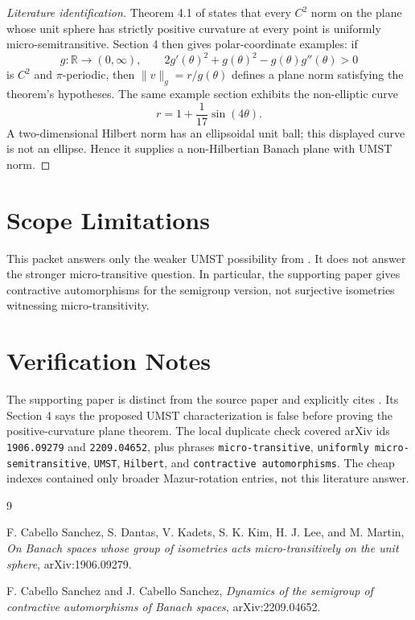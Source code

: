 \documentclass[11pt]{article}
\begin{document}
\begin{proof}[Literature identification]
Theorem 4.1 of \cite{CC} states that every \(C^2\) norm on the plane whose
unit sphere has strictly positive curvature at every point is uniformly
micro-semitransitive. Section 4 then gives polar-coordinate examples: if
\[
  g:\mathbb R\to (0,\infty), \qquad
  2g'(\theta)^2+g(\theta)^2-g(\theta)g''(\theta)>0
\]
is \(C^2\) and \(\pi\)-periodic, then \(\|v\|_g=r/g(\theta)\) defines a plane
norm satisfying the theorem's hypotheses. The same example section exhibits
the non-elliptic curve
\[
  r=1+\frac{1}{17}\sin(4\theta).
\]
A two-dimensional Hilbert norm has an ellipsoidal unit ball; this displayed
curve is not an ellipse. Hence it supplies a non-Hilbertian Banach plane with
UMST norm.
\end{proof}

\section*{Scope Limitations}

This packet answers only the weaker UMST possibility from \cite{CDKKLM}. It
does not answer the stronger micro-transitive question. In particular, the
supporting paper gives contractive automorphisms for the semigroup version,
not surjective isometries witnessing micro-transitivity.

\section*{Verification Notes}

The supporting paper is distinct from the source paper and explicitly cites
\cite{CDKKLM}. Its Section 4 says the proposed UMST characterization is false
before proving the positive-curvature plane theorem. The local duplicate check
covered arXiv ids \texttt{1906.09279} and \texttt{2209.04652}, plus phrases
\texttt{micro-transitive}, \texttt{uniformly micro-semitransitive},
\texttt{UMST}, \texttt{Hilbert}, and \texttt{contractive automorphisms}. The
cheap indexes contained only broader Mazur-rotation entries, not this
literature answer.

\begin{thebibliography}{9}

F. Cabello Sanchez, S. Dantas, V. Kadets, S. K. Kim, H. J. Lee, and
M. Martin,
\emph{On Banach spaces whose group of isometries acts micro-transitively on
the unit sphere},
arXiv:1906.09279.

F. Cabello Sanchez and J. Cabello Sanchez,
\emph{Dynamics of the semigroup of contractive automorphisms of Banach spaces},
arXiv:2209.04652.

\end{thebibliography}
\end{document}
